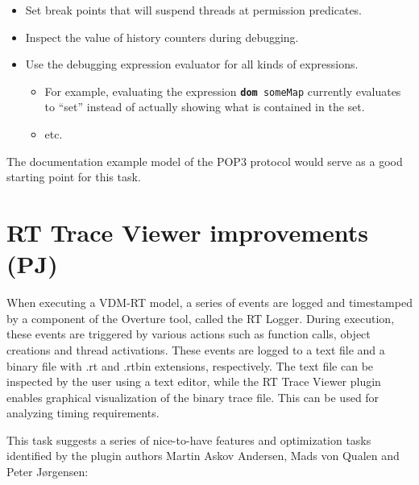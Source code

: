 \documentclass[11pt]{overturerep}
\begin{document}
\begin{itemize} 
    \item Set break points that will suspend threads at permission predicates.
    \item Inspect the value of history counters during debugging. 
    \item Use the debugging expression evaluator for all kinds of expressions.  
        \begin{itemize} 
            \item For example, evaluating the expression \texttt{\textbf{dom}
            someMap} currently evaluates to ``set'' instead of actually showing
            what is contained in the set.  
            \item etc.
        \end{itemize} 
\end{itemize}

The documentation example model of the POP3 protocol would serve as a good
starting point for this task.

\section{RT Trace Viewer improvements (PJ)}

When executing a VDM-RT model, a series of events are logged and timestamped by
a component of the Overture tool, called the RT Logger. During execution, these
events are triggered by various actions such as function calls, object
creations and thread activations. These events are logged to a text file and a
binary file with .rt and .rtbin extensions, respectively. The text file can be
inspected by the user using a text editor, while the RT Trace Viewer plugin
enables graphical visualization of the binary trace file. This can be used for
analyzing timing requirements.

This task suggests a series of nice-to-have features and optimization tasks
identified by the plugin authors Martin Askov Andersen, Mads von Qualen and
Peter J\o rgensen:
\end{document}

